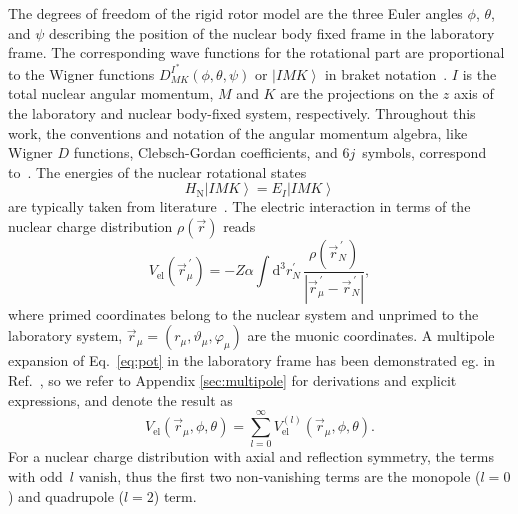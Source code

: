 The degrees of freedom of the rigid rotor model are the three Euler angles $\phi$, $\theta$, and $\psi$ describing the position of the nuclear body fixed frame in the laboratory frame. The corresponding wave functions for the rotational part are proportional to the Wigner functions $D^{I^{\,*}}_{MK}(\phi,\theta,\psi)$ or $\left|IMK\right>$ in braket notation~\cite{ring_schuck,brown_carrington}. $I$ is the total nuclear angular momentum, $M$ and $K$ are the projections on the $z$ axis of the laboratory and nuclear body-fixed system, respectively. Throughout this work, the conventions and notation of the angular momentum algebra, like Wigner $D$ functions, Clebsch-Gordan coefficients, and $6j$~symbols, correspond to~\cite{varshalovich1988}. The energies of the nuclear rotational states
\begin{equation}
H_{\text{N}} \left|IMK\right> = E_I \left|IMK\right>
\label{eq:enucl}
\end{equation}
are typically taken from literature~\cite{ENSDF}. The electric interaction in terms of the nuclear charge distribution $\rho(\vec{r})$ reads
\begin{equation}
V_{\text{el}}(\vec{r}_\mu^{\,\prime}) = -Z \alpha \int \text{d}^3 r_N^{\prime}\, \frac{\rho(\vec{r}_N^{\,\prime})}{|\vec{r}_\mu^{\,\prime}-\vec{r}_N^{\,\prime}|},
\label{eq:pot}
\end{equation}
where primed coordinates belong to the nuclear system and unprimed to the laboratory system, ${\vec{r}_{\mu}}{=}{(r_\mu,\vartheta_\mu,\varphi_\mu)}$ are the muonic coordinates. A multipole expansion of Eq.~\eqref{eq:pot} in the laboratory frame has been demonstrated eg. in Ref.~\cite{kozhedub2008}, so we refer to Appendix \ref{sec:multipole} for derivations and explicit expressions, and denote the result as
\begin{equation}
V_{\text{el}}(\vec{r}_\mu,\phi,\theta) = \sum_{l=0}^\infty V^{(l)}_{\text{el}}(\vec{r}_\mu,\phi,\theta).
\label{eq:multipoles}
\end{equation}
For a nuclear charge distribution with axial and reflection symmetry, the terms with odd~$l$ vanish, thus the first two non-vanishing terms are the monopole (${l}{=}{0}$) and quadrupole (${l}{=}{2}$) term.

